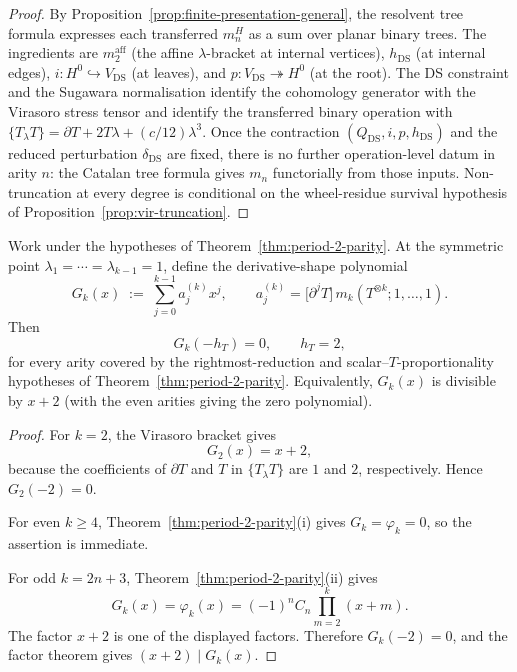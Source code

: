 \begin{proof}
By Proposition~\ref{prop:finite-presentation-general}, the
resolvent tree formula expresses each transferred $m_n^H$ as a
sum over planar binary trees. The ingredients are
$m_2^{\mathrm{aff}}$ (the affine $\lambda$-bracket at internal
vertices), $h_{\mathrm{DS}}$ (at internal edges),
$i \colon H^0 \hookrightarrow V_{\mathrm{DS}}$
(at leaves), and $p \colon V_{\mathrm{DS}} \twoheadrightarrow H^0$
(at the root).
The DS constraint and the Sugawara normalisation identify the
cohomology generator with the Virasoro stress tensor and identify the
transferred binary operation with
\(\{T{}_\lambda T\}=\partial T+2T\lambda+(c/12)\lambda^3\).
Once the contraction \((Q_{\mathrm{DS}},i,p,h_{\mathrm{DS}})\) and
the reduced perturbation \(\delta_{\mathrm{DS}}\) are fixed, there is
no further operation-level datum in arity \(n\): the Catalan tree
formula gives $m_n$ functorially from those inputs.
Non-truncation at every degree is conditional on the wheel-residue
survival hypothesis of Proposition~\ref{prop:vir-truncation}.
\end{proof}

\begin{proposition}
\label{prop:graviton-tracelessness}
Work under the hypotheses of Theorem~\ref{thm:period-2-parity}.  At
the symmetric point $\lambda_1=\cdots=\lambda_{k-1}=1$, define
the derivative-shape polynomial
\[
G_k(x)
\;:=\;
\sum_{j=0}^{k-1} a_j^{(k)}x^j,
\qquad
a_j^{(k)}
=
\bigl[\partial^jT\bigr]\,
m_k(T^{\otimes k};1,\ldots,1).
\]
Then
\[
G_k(-h_T)=0,\qquad h_T=2,
\]
for every arity covered by the rightmost-reduction and
scalar--\(T\)-proportionality hypotheses of
Theorem~\ref{thm:period-2-parity}. Equivalently, $G_k(x)$ is
divisible by \(x+2\) \textup{(}with the even arities giving the
zero polynomial\textup{)}.
\end{proposition}

\begin{proof}
For $k=2$, the Virasoro bracket gives
\[
G_2(x)=x+2,
\]
because the coefficients of \(\partial T\) and \(T\) in
\(\{T{}_\lambda T\}\) are \(1\) and \(2\), respectively. Hence
\(G_2(-2)=0\).

For even \(k\ge4\), Theorem~\ref{thm:period-2-parity}(i) gives
\(G_k=\varphi_k=0\), so the assertion is immediate.

For odd \(k=2n+3\), Theorem~\ref{thm:period-2-parity}(ii) gives
\[
G_k(x)=\varphi_k(x)
=(-1)^n C_n\prod_{m=2}^{k}(x+m).
\]
The factor \(x+2\) is one of the displayed factors.  Therefore
\(G_k(-2)=0\), and the factor theorem gives \((x+2)\mid G_k(x)\).
\end{proof}


